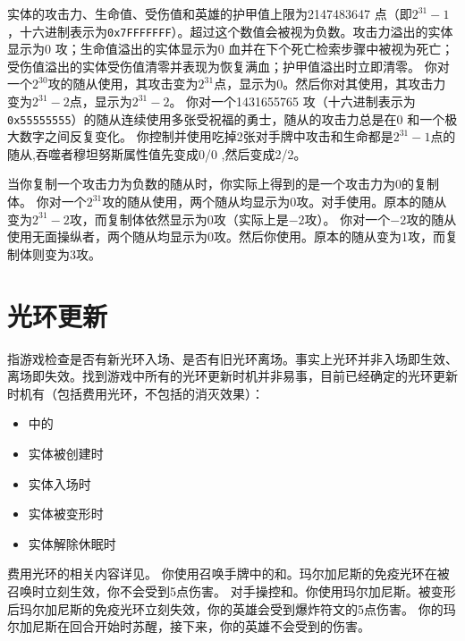 实体的攻击力、生命值、受伤值和英雄的护甲值上限为2147483647 点（即$2^31-1$，十六进制表示为\texttt{0x7FFFFFFF}）。超过这个数值会被视为负数。攻击力溢出的实体显示为0 攻；生命值溢出的实体显示为0 血并在下个死亡检索步骤中被视为死亡；受伤值溢出的实体受伤值清零并表现为恢复满血；护甲值溢出时立即清零。
\example 你对一个$2^30$攻的随从使用，其攻击变为$2^31$点，显示为0。然后你对其使用，其攻击力变为$2^31-2$点，显示为$2^31-2$。
\example 你对一个1431655765 攻（十六进制表示为\texttt{0x55555555}）的随从连续使用多张受祝福的勇士，随从的攻击力总是在0 和一个极大数字之间反复变化。
\example 你控制并使用吃掉2张对手牌中攻击和生命都是$2^31-1$点的随从,吞噬者穆坦努斯属性值先变成0/0 ,然后变成2/2。

当你复制一个攻击力为负数的随从时，你实际上得到的是一个攻击力为0的复制体。
\example 你对一个$2^31$攻的随从使用，两个随从均显示为0攻。对手使用。原本的随从变为$2^31-2$攻，而复制体依然显示为0攻（实际上是$-2$攻）。
\example 你对一个$-2$攻的随从使用无面操纵者，两个随从均显示为0攻。然后你使用。原本的随从变为1攻，而复制体则变为3攻。

\section{光环更新}
\label{aura-update}

指游戏检查是否有新光环入场、是否有旧光环离场。事实上光环并非入场即生效、离场即失效。找到游戏中所有的光环更新时机并非易事，目前已经确定的光环更新时机有（包括费用光环，不包括的消灭效果）：
\begin{itemize}
    \item {}中的
    \item 实体被创建时
    \item 实体入场时
    \item 实体被变形时
    \item 实体解除休眠时
\end{itemize}

\notice 费用光环的相关内容详见。
\example 你使用召唤手牌中的和。玛尔加尼斯的免疫光环在被召唤时立刻生效，你不会受到5点伤害。
\example 对手操控和。你使用玛尔加尼斯。被变形后玛尔加尼斯的免疫光环立刻失效，你的英雄会受到爆炸符文的5点伤害。
\example 你的玛尔加尼斯在回合开始时苏醒，接下来，你的英雄不会受到的伤害。

